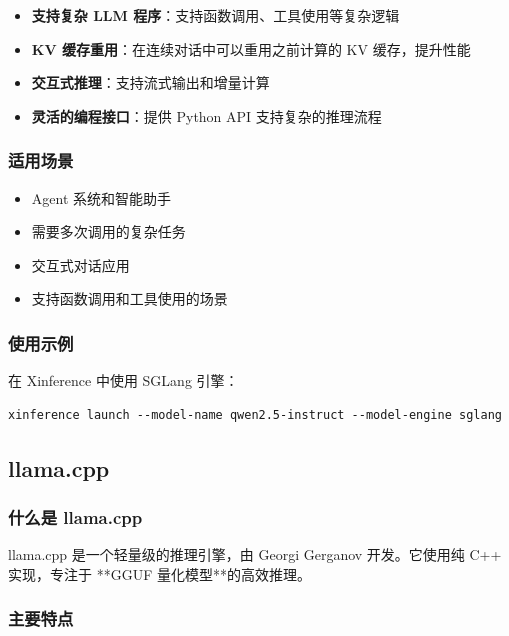 \documentclass[12pt,UTF8]{ctexbook}
\begin{document}
\begin{itemize}[leftmargin=2cm]
    \item \textbf{支持复杂 LLM 程序}：支持函数调用、工具使用等复杂逻辑
    \item \textbf{KV 缓存重用}：在连续对话中可以重用之前计算的 KV 缓存，提升性能
    \item \textbf{交互式推理}：支持流式输出和增量计算
    \item \textbf{灵活的编程接口}：提供 Python API 支持复杂的推理流程
\end{itemize}

\subsubsection{适用场景}

\begin{itemize}[leftmargin=2cm]
    \item Agent 系统和智能助手
    \item 需要多次调用的复杂任务
    \item 交互式对话应用
    \item 支持函数调用和工具使用的场景
\end{itemize}

\subsubsection{使用示例}

在 Xinference 中使用 SGLang 引擎：

\begin{lstlisting}
xinference launch --model-name qwen2.5-instruct --model-engine sglang
\end{lstlisting}

\subsection{llama.cpp}
\label{subsec:llamacpp}

\subsubsection{什么是 llama.cpp}

llama.cpp 是一个轻量级的推理引擎，由 Georgi Gerganov 开发。它使用纯 C++ 实现，专注于 **GGUF 量化模型**的高效推理。

\subsubsection{主要特点}
\end{document}
